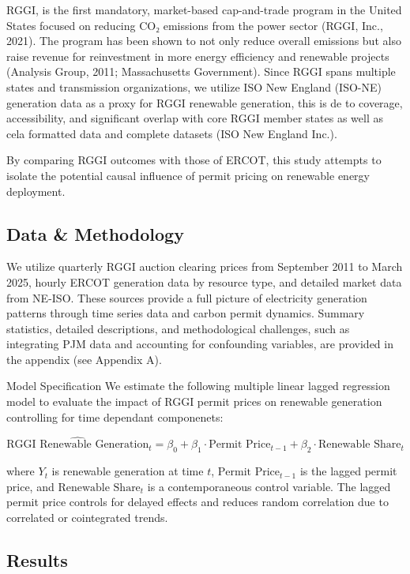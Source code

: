 \documentclass[
]{article}
\begin{document}
RGGI, is the first mandatory, market-based cap-and-trade program in the
United States focused on reducing CO₂ emissions from the power sector
(RGGI, Inc., 2021). The program has been shown to not only reduce
overall emissions but also raise revenue for reinvestment in more energy
efficiency and renewable projects (Analysis Group, 2011; Massachusetts
Government). Since RGGI spans multiple states and transmission
organizations, we utilize ISO New England (ISO-NE) generation data as a
proxy for RGGI renewable generation, this is de to coverage,
accessibility, and significant overlap with core RGGI member states as
well as cela formatted data and complete datasets (ISO New England
Inc.).

By comparing RGGI outcomes with those of ERCOT, this study attempts to
isolate the potential causal influence of permit pricing on renewable
energy deployment.

\subsection{Data \& Methodology}\label{data-methodology}

We utilize quarterly RGGI auction clearing prices from September 2011 to
March 2025, hourly ERCOT generation data by resource type, and detailed
market data from NE-ISO. These sources provide a full picture of
electricity generation patterns through time series data and carbon
permit dynamics. Summary statistics, detailed descriptions, and
methodological challenges, such as integrating PJM data and accounting
for confounding variables, are provided in the appendix (see Appendix
A).

Model Specification We estimate the following multiple linear lagged
regression model to evaluate the impact of RGGI permit prices on
renewable generation controlling for time dependant componenets:

\[
\widehat{\text{RGGI Renewable Generation}}_t = \beta_0 + \beta_1 \cdot \text{Permit Price}_{t-1} + \beta_2 \cdot \text{Renewable Share}_t
\]

where \(Y_t\) is renewable generation at time \(t\),
\(\text{Permit Price}_{t-1}\) is the lagged permit price, and
\(\text{Renewable Share}_t\) is a contemporaneous control variable. The
lagged permit price controls for delayed effects and reduces random
correlation due to correlated or cointegrated trends.

\subsection{Results}\label{results}
\end{document}
